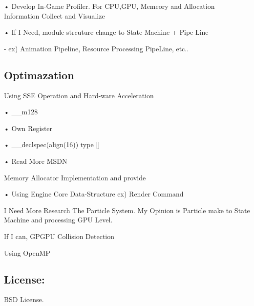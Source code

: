 • Develop In-\/\+Game Profiler. For C\+PU,G\+PU, Memeory and Allocation Information Collect and Visualize

• If I Need, module strcuture change to State Machine + Pipe Line \begin{DoxyVerb}- ex) Animation Pipeline, Resource Processing PipeLine, etc..
\end{DoxyVerb}


\subsection*{Optimazation}

Using S\+SE Operation and Hard-\/ware Acceleration \begin{DoxyVerb}• __m128

• Own Register

• __declspec(align(16)) type []

•  Read More MSDN 
\end{DoxyVerb}


Memory Allocator Implementation and provide \begin{DoxyVerb}• Using Engine Core Data-Structure ex) Render Command
\end{DoxyVerb}


I Need More Research The Particle System. My Opinion is Particle make to State Machine and processing G\+PU Level.

If I can, G\+P\+G\+PU Collision Detection

Using Open\+MP

\subsection*{License\+:}

B\+SD License.

~\newline
 ~\newline
 